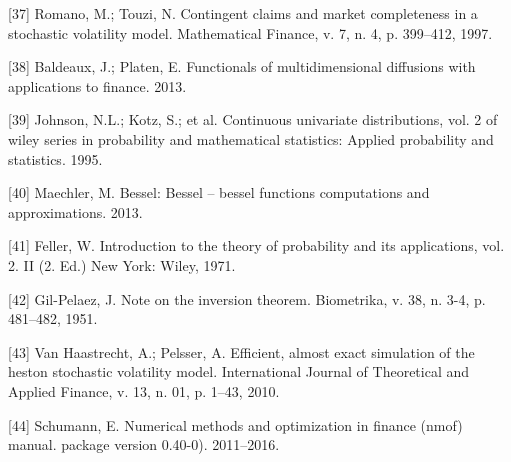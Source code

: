 \documentclass[12pt,twoside]{reedthesis}
\theoremstyle{definition}
\theoremstyle{definition}
\theoremstyle{remark}
\begin{document}
  \hypertarget{ref-romano1997}{}
  {[}37{]} Romano, M.; Touzi, N. Contingent claims and market completeness
  in a stochastic volatility model. Mathematical Finance, v. 7, n. 4, p.
  399--412, 1997.
  
  \hypertarget{ref-baldeaux}{}
  {[}38{]} Baldeaux, J.; Platen, E. Functionals of multidimensional
  diffusions with applications to finance. 2013.
  
  \hypertarget{ref-johnson1995}{}
  {[}39{]} Johnson, N.L.; Kotz, S.; et al. Continuous univariate
  distributions, vol. 2 of wiley series in probability and mathematical
  statistics: Applied probability and statistics. 1995.
  
  \hypertarget{ref-besselpkg}{}
  {[}40{]} Maechler, M. Bessel: Bessel -- bessel functions computations
  and approximations. 2013.
  
  \hypertarget{ref-feller1971introduction}{}
  {[}41{]} Feller, W. Introduction to the theory of probability and its
  applications, vol. 2. II (2. Ed.) New York: Wiley, 1971.
  
  \hypertarget{ref-gil1951note}{}
  {[}42{]} Gil-Pelaez, J. Note on the inversion theorem. Biometrika, v.
  38, n. 3-4, p. 481--482, 1951.
  
  \hypertarget{ref-van2010efficient}{}
  {[}43{]} Van Haastrecht, A.; Pelsser, A. Efficient, almost exact
  simulation of the heston stochastic volatility model. International
  Journal of Theoretical and Applied Finance, v. 13, n. 01, p. 1--43,
  2010.
  
  \hypertarget{ref-nmofpack}{}
  {[}44{]} Schumann, E. Numerical methods and optimization in finance
  (nmof) manual. package version 0.40-0). 2011--2016.


\end{document}
